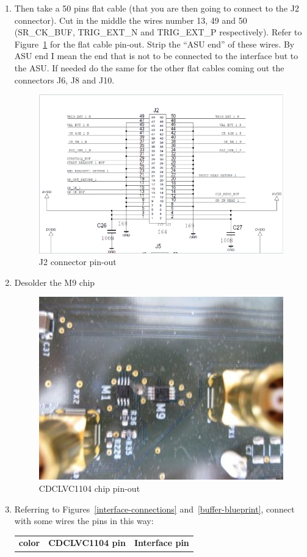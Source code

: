 \begin{enumerate}
\item Then take a 50 pins flat cable (that you are then going to
  connect to the J2 connector). Cut in the middle the wires number 13,
  49 and 50 (SR\_CK\_BUF, TRIG\_EXT\_N and TRIG\_EXT\_P
  respectively). Refer to Figure~\ref{J2} for the flat cable
  pin-out. Strip the ``ASU end'' of these wires. By ASU end I mean the
  end that is not to be connected to the interface but to the ASU. If
  needed do the same for the other flat cables coming out the
  connectors J6, J8 and J10.
  \begin{figure}[H]
    \centering \includegraphics[frame,width=0.7\linewidth]{J2}
    \caption{J2 connector pin-out}\label{J2}
  \end{figure}
\item Desolder the M9 chip
  \begin{figure}[H]
    \centering \includegraphics[frame,width=0.5\linewidth]{desolder}
    \caption{CDCLVC1104 chip pin-out}\label{desolder}
  \end{figure}
\item Referring to Figures~\ref{interface-connections}
  and~\ref{buffer-blueprint}, connect with some wires the pins in this
  way:
  \begin{table}[H]
    \centering \bgroup
    \def\arraystretch{1.5}%
    \begin{tabular}{|c|c|c|}
      \hline
      \textbf{color} & \textbf{CDCLVC1104 pin} & \textbf{Interface pin} \\

\end{tabular}
\end{table}
\end{enumerate}
